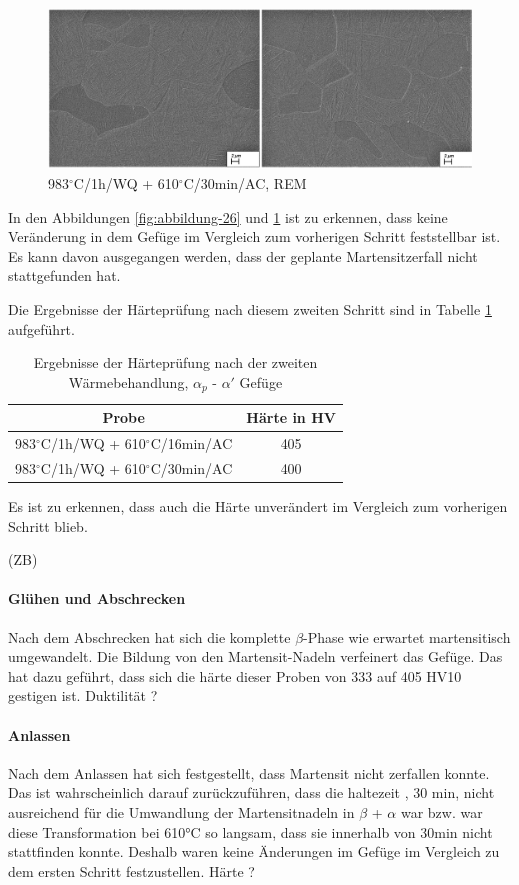 \begin{figure}
	\centering
	\includegraphics[width=1.0\linewidth]{./Bilder/Abbildung 27.png}
	\caption[Abbildung 27]{983$^\circ$C/1h/WQ + 610$^\circ$C/30min/AC, REM}
	\label{fig:abbildung-27}
\end{figure}

In den Abbildungen \ref{fig:abbildung-26} und \ref{fig:abbildung-27} ist zu erkennen, dass keine Veränderung in dem Gefüge im Vergleich zum vorherigen Schritt feststellbar ist. Es kann davon ausgegangen werden, dass der geplante Martensitzerfall nicht stattgefunden hat.

Die Ergebnisse der Härteprüfung nach diesem zweiten Schritt sind in Tabelle \ref{Tabelle 9} aufgeführt.

\begin{table}
	\centering
	\begin{tabular}{|c|c|}
		\hline 
		Probe & Härte in HV \\ 
		\hline 
		983$^\circ$C/1h/WQ + 610$^\circ$C/16min/AC & 405 \\ 
		\hline 
		983$^\circ$C/1h/WQ + 610$^\circ$C/30min/AC & 400 \\ 
		\hline 
	\end{tabular} 
	\caption{Ergebnisse der Härteprüfung nach der zweiten Wärmebehandlung, $\alpha_p$ - $\alpha'$ Gefüge}
	\label{Tabelle 9}
\end{table}

Es ist zu erkennen, dass auch die Härte unverändert im Vergleich zum vorherigen Schritt blieb.

(ZB)

\paragraph{Glühen und Abschrecken}
Nach dem Abschrecken hat sich die komplette $\beta$-Phase wie erwartet martensitisch umgewandelt. Die Bildung von den Martensit-Nadeln verfeinert das Gefüge. Das hat dazu geführt, dass sich die härte dieser Proben von 333 auf 405 HV10 gestigen ist. Duktilität ?
\paragraph{Anlassen} Nach dem Anlassen hat sich festgestellt, dass Martensit nicht zerfallen konnte. Das ist wahrscheinlich darauf zurückzuführen, dass die haltezeit , 30 min, nicht ausreichend für die Umwandlung der Martensitnadeln in  $\beta$ + $\alpha$ war bzw. war diese Transformation bei 610°C so langsam, dass sie innerhalb von 30min nicht stattfinden konnte.
Deshalb waren keine Änderungen im Gefüge im Vergleich zu dem ersten Schritt  festzustellen. Härte ?

